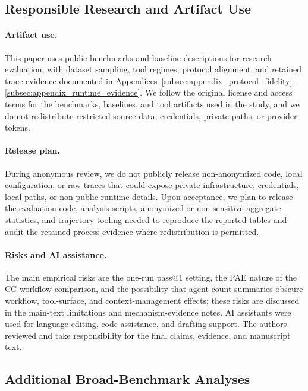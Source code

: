 \subsection{Responsible Research and Artifact Use}
\label{subsec:appendix_responsible_artifact_use}

\paragraph{Artifact use.}
This paper uses public benchmarks and baseline descriptions for research evaluation, with dataset sampling, tool regimes, protocol alignment, and retained trace evidence documented in Appendices~\ref{subsec:appendix_protocol_fidelity}--\ref{subsec:appendix_runtime_evidence}. We follow the original license and access terms for the benchmarks, baselines, and tool artifacts used in the study, and we do not redistribute restricted source data, credentials, private paths, or provider tokens.

\paragraph{Release plan.}
During anonymous review, we do not publicly release non-anonymized code, local configuration, or raw traces that could expose private infrastructure, credentials, local paths, or non-public runtime details. Upon acceptance, we plan to release the evaluation code, analysis scripts, anonymized or non-sensitive aggregate statistics, and trajectory tooling needed to reproduce the reported tables and audit the retained process evidence where redistribution is permitted.

\paragraph{Risks and AI assistance.}
The main empirical risks are the one-run pass@1 setting, the PAE nature of the CC-workflow comparison, and the possibility that agent-count summaries obscure workflow, tool-surface, and context-management effects; these risks are discussed in the main-text limitations and mechanism-evidence notes. AI assistants were used for language editing, code assistance, and drafting support. The authors reviewed and take responsibility for the final claims, evidence, and manuscript text.

\subsection{Additional Broad-Benchmark Analyses}
\label{subsec:appendix_broad_benchmark_analyses}

